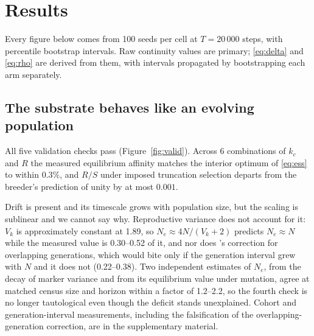 \documentclass[review,3p,times]{elsarticle}
\begin{document}
\section{Results}

Every figure below comes from 100 seeds per cell at $T=20\,000$ steps, with percentile bootstrap intervals. Raw continuity values are
primary; \eqref{eq:delta} and \eqref{eq:rho} are derived from them, with
intervals propagated by bootstrapping each arm separately.

\subsection{The substrate behaves like an evolving population}

All five validation checks pass (Figure~\ref{fig:valid}). Across 6 combinations of $k_c$ and $R$ the measured
equilibrium affinity matches the interior optimum of \eqref{eq:ess} to
within 0.3\%, and $R/S$ under imposed truncation
selection departs from the breeder's prediction of unity by at most
$0.001$.

Drift is present and its timescale grows with population size,
but the scaling is sublinear and we cannot say why. Reproductive
variance does not account for it: $V_k$ is approximately
constant at 1.89, so $N_e\approx4N/(V_k+2)$
predicts $N_e\approx N$ while the measured value is 0.30--0.52 of it, and
nor does \citet{hill1972}'s correction for overlapping
generations, which would bite only if the generation interval
grew with $N$ and it does not (0.22--0.38). Two independent estimates of $N_e$, from
the decay of marker variance and from its equilibrium value
under mutation, agree at matched census size and horizon within
a factor of 1.2--2.2, so
the fourth check is no longer tautological even though the
deficit stands unexplained. Cohort and generation-interval
measurements, including the falsification of the
overlapping-generation correction, are in the supplementary
material.
\end{document}
